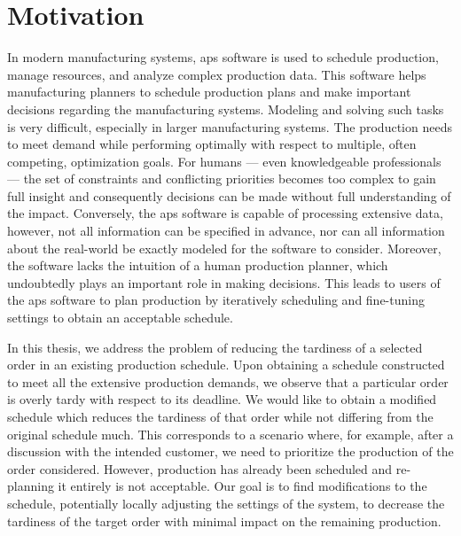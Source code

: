  \label{chap:introduction}

\section*{Motivation} \label{sec:introduction/motivation}

In modern manufacturing systems, \ac{aps} software is used to schedule production,
manage resources, and analyze complex production data.
This software helps manufacturing planners to schedule production plans
and make important decisions regarding the manufacturing systems.
Modeling and solving such tasks is very difficult, especially in larger manufacturing systems.
The production needs to meet demand while performing optimally with respect to multiple,
often competing, optimization goals.
For humans --- even knowledgeable professionals ---
the set of constraints and conflicting priorities becomes too complex to gain full insight
and consequently decisions can be made without full understanding of the impact.
Conversely, the \ac{aps} software is capable of processing extensive data,
however, not all information can be specified in advance,
nor can all information about the real-world be exactly modeled for the software to consider.
Moreover, the software lacks the intuition of a human production planner,
which undoubtedly plays an important role in making decisions.
This leads to users of the \ac{aps} software to plan production by iteratively
scheduling and fine-tuning settings to obtain an acceptable schedule.

In this thesis, we address the problem of reducing the tardiness
of a selected order in an existing production schedule.
Upon obtaining a schedule constructed to meet all the extensive production demands,
we observe that a particular order is overly tardy with respect to its deadline.
We would like to obtain a modified schedule which reduces the tardiness of that order
while not differing from the original schedule much.
This corresponds to a scenario where, for example, after a discussion with the intended customer,
we need to prioritize the production of the order considered.
However, production has already been scheduled and re-planning it entirely is not acceptable.
Our goal is to find modifications to the schedule,
potentially locally adjusting the settings of the system,
to decrease the tardiness of the target order with minimal impact on the remaining production.

